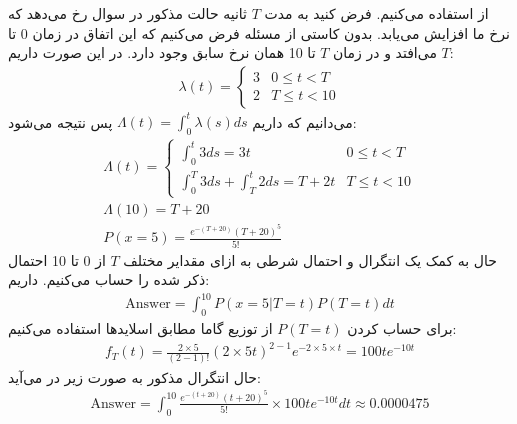 از
استفاده می‌کنیم. فرض کنید به مدت
$T$
ثانیه حالت مذکور در سوال رخ می‌دهد که نرخ ما افزایش می‌یابد. بدون کاستی از مسئله فرض می‌کنیم که این اتفاق
در زمان 0 تا
$T$
می‌افتد و در زمان
$T$
تا 10 همان نرخ سابق وجود دارد.
در این صورت داریم:
\begin{gather*}
    \lambda(t) = \begin{cases}
        3 & 0 \le t < T \\
        2 & T \le t < 10
    \end{cases}
\end{gather*}
می‌دانیم که داریم
$\Lambda(t) = \int_{0}^{t} \lambda(s) ds$
پس نتیجه می‌شود:
\begin{gather*}
    \Lambda(t) = \begin{cases}
        \int_{0}^{t} 3 ds = 3t & 0 \le t < T \\
        \int_{0}^{T} 3 ds + \int_{T}^{t} 2 ds = T + 2 t & T \le t < 10
    \end{cases}\\
    \Lambda(10) = T + 20\\
    P(x = 5) = \frac{e^{-(T + 20)} (T + 20)^5}{5!}
\end{gather*}
حال به کمک یک انتگرال و احتمال شرطی به ازای مقدایر مختلف
$T$
از 0 تا 10 احتمال ذکر شده را حساب می‌کنیم. داریم:
\begin{gather*}
    \text{Answer} = \int_{0}^{10} P(x = 5 | T = t) P(T = t) dt
\end{gather*}
برای حساب کردن
$P(T = t)$
از
توزیع گاما مطابق اسلاید‌ها استفاده می‌کنیم:
\begin{gather*}
    f_T(t) = \frac{2 \times 5}{(2 - 1)!} (2 \times 5 t)^{2 - 1} e^{-2 \times 5 \times t} = 100 t e^{-10t}
\end{gather*}
حال انتگرال مذکور به صورت زیر در می‌آید:
\begin{gather*}
    \text{Answer} = \int_{0}^{10} \frac{e^{-(t + 20)} (t + 20)^5}{5!} \times 100 t e^{-10t} dt \approx 0.0000475
\end{gather*}
\



